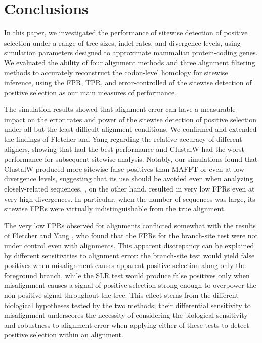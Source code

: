 \documentclass{mbe}
\begin{document}
\section*{Conclusions}

In this paper, we investigated the performance of sitewise detection
of positive selection under a range of tree sizes, indel rates, and
divergence levels, using simulation parameters designed to approximate
mammalian protein-coding genes. We evaluated the ability of four
alignment methods and three alignment filtering methods to accurately
reconstruct the codon-level homology for sitewise inference, using the
FPR, TPR, and error-controlled \tpr of the sitewise detection of
positive selection as our main measures of performance.

The simulation results showed that alignment error can have a
measurable impact on the error rates and power of the sitewise
detection of positive selection under all but the least difficult
alignment conditions. We confirmed and extended the findings of
Fletcher and Yang \citeyearpar{Fletcher2010Effect} regarding the
relative accuracy of different aligners, showing that \prankc had the
best performance and ClustalW had the worst performance for subsequent
sitewise analysis. Notably, our simulations found that ClustalW
produced more sitewise false positives than MAFFT or \prankc even at
low divergence levels, suggesting that its use should be avoided even
when analyzing closely-related sequences. \prankc, on the other hand,
resulted in very low FPRs even at very high divergences. In
particular, when the number of sequences was large, its sitewise FPRs
were virtually indistinguishable from the true alignment.

The very low FPRs observed for \prankc alignments conflicted somewhat
with the results of Fletcher and Yang
\citeyearpar{Fletcher2010Effect}, who found that the FPRs for the
branch-site test were not under control even with \prankc
alignments. This apparent discrepancy can be explained by different
sensitivities to alignment error: the branch-site test would yield
false positives when misalignment causes apparent positive selection
along only the foreground branch, while the SLR test would produce
false positives only when misalignment causes a signal of positive
selection strong enough to overpower the non-positive signal
throughout the tree. This effect stems from the different biological
hypotheses tested by the two methods; their differential sensitivity
to misalignment underscores the necessity of considering the
biological sensitivity and robustness to alignment error when applying
either of these tests to detect positive selection within an
alignment.
\end{document}
